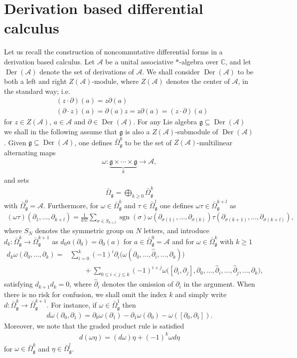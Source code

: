 \documentclass{amsart}
\newcommand{\complex}{\mathbb{C}}
\newcommand{\paraa}[1]{\big(#1\big)}
\newcommand{\sgn}{\operatorname{sgn}}
\theoremstyle{definition}
\theoremstyle{remark}
\numberwithin{equation}{section}
\newcommand{\A}{\mathcal{A}}
\renewcommand{\d}{\partial}
\newcommand{\Der}{\operatorname{Der}}
\newcommand{\g}{\mathfrak{g}}
\newcommand{\Omegabg}[1]{\bar{\Omega}^{#1}_{\g}}
\begin{document}
\section{Derivation based differential calculus}\label{sec:der.calculus}

Let us recall the construction of noncommutative differential forms in
a derivation based calculus. Let $\A$ be a unital associative $\ast$-algebra
over $\complex$, and let $\Der(\A)$ denote the set of derivations of
$\A$. We shall consider $\Der(\A)$ to be both a left and right $Z(\A)$-module, where
$Z(\A)$ denotes the center of $\A$, in the standard way;
i.e.
\begin{align*}
  &(z\cdot \d)(a)=z\d(a)\\
  &(\d\cdot z)(a)=\d(a)z=z\d(a)=(z\cdot \d)(a)
\end{align*}
for $z\in Z(\A)$, $a\in\A$ and $\d\in\Der(\A)$. For any Lie algebra
$\g\subseteq\Der(\A)$ we shall in the following assume that $\g$ is
also a $Z(\A)$-submodule of $\Der(\A)$.  Given $\g\subseteq\Der(\A)$,
one defines $\Omegabg{k}$ to be the set of $Z(\A)$-multilinear
alternating maps
\begin{align*}
  \omega:\underbrace{\g\times\cdots\times\g}_k\to\A,
\end{align*}
and sets
\begin{align*}
  \Omegabg{} = \bigoplus_{k\geq 0}\Omegabg{k}
\end{align*}
with $\Omegabg{0}=\A$. Furthermore, for $\omega\in\Omegabg{k}$ and
$\tau\in\Omegabg{l}$ one defines $\omega\tau\in\Omegabg{k+l}$ as
\begin{align*}
  (\omega\tau)(\d_1,\ldots,\d_{k+l}) =
  \frac{1}{k!l!}\sum_{\sigma\in S_{k+l}}\sgn(\sigma)\omega(\d_{\sigma(1)},\ldots,\d_{\sigma(k)})
  \tau(\d_{\sigma(k+1)},\ldots,\d_{\sigma(k+l)}),
\end{align*}
where $S_N$ denotes the symmetric group on $N$ letters, and introduce
$d_k:\Omegabg{k}\to\Omegabg{k+1}$ as $d_0a(\d_0)=\d_0(a)$ for
$a\in\Omegabg{0}=\A$ and for $\omega\in\Omegabg{k}$ with $k\geq 1$
\begin{align*}
  d_k\omega(\d_0,\ldots,\d_{k}) =
  &\sum_{i=0}^k(-1)^i\d_i\paraa{\omega(\d_0,\ldots,\hat{\d}_{i},\ldots,\d_k)}\\
  &\qquad+\sum_{0\leq i<j\leq k}(-1)^{i+j}\omega\paraa{[\d_i,\d_j],\d_0,\ldots,\hat{\d}_i,\ldots,\hat{\d}_j,\ldots,\d_k},
\end{align*}
satisfying $d_{k+1}d_{k}=0$, where $\hat{\d}_i$ denotes the omission
of $\d_i$ in the argument. When there is no risk for confusion, we
shall omit the index $k$ and simply write
$d:\Omegabg{k}\to\Omegabg{k+1}$. For instance, if
$\omega\in\Omegabg{1}$ then
\begin{align*}
  d\omega(\d_0,\d_1) = \d_0\omega(\d_1)-\d_1\omega(\d_0)-\omega([\d_0,\d_1]). 
\end{align*}
Moreover, we note that the graded product rule is satisfied
\begin{align*}
  d(\omega\eta) = (d\omega)\eta + (-1)^k\omega d\eta 
\end{align*}
for $\omega\in\Omegabg{k}$ and $\eta\in\Omegabg{l}$. 
\end{document}
